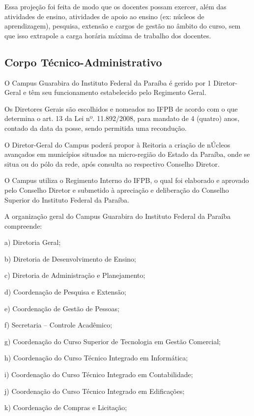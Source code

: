 Essa proje\c{c}\~ao foi feita de modo que os docentes possam exercer, al\'em das atividades de ensino, atividades de apoio ao ensino (ex: n\'ucleos de aprendizagem), pesquisa, extens\~ao e cargos de gest\~ao no \^ambito do curso, sem que isso extrapole a carga hor\'aria m\'axima de trabalho dos docentes.

\subsection{Corpo T\'ecnico-Administrativo}

O Campus Guarabira do Instituto Federal da Paraíba é gerido por 1 Diretor-Geral e têm seu funcionamento estabelecido pelo Regimento Geral.

Os Diretores Gerais são escolhidos e nomeados no IFPB de acordo com o que determina o art. 13 da Lei nº. 11.892/2008, para mandato de 4 (quatro) anos, contado da data da posse, sendo permitida uma recondução.

O Diretor-Geral do Campus poderá propor à Reitoria a criação de nÚcleos avançados em municípios situados na micro-região do Estado da Paraíba, onde se situa ou do pólo da rede, após consulta ao respectivo Conselho Diretor.

O Campus utiliza o Regimento Interno do IFPB, o qual foi elaborado e aprovado pelo Conselho Diretor e submetido à apreciação e deliberação do Conselho Superior do Instituto Federal da Paraíba.

A organização geral do Campus Guarabira do Instituto Federal da Paraíba compreende:

a)	Diretoria Geral;

b)	Diretoria de Desenvolvimento de Ensino;

c)	Diretoria de Administração e Planejamento;

d)	Coordenação de Pesquisa e Extensão;

e)	Coordenação de Gestão de Pessoas;

f)	Secretaria – Controle Acadêmico;

g)	Coordenação do Curso Superior de Tecnologia em Gestão Comercial;

h)	Coordenação do Curso T\'ecnico Integrado em Inform\'atica;

i)	Coordenação do Curso T\'ecnico Integrado em Contabilidade;

j)	Coordenação do Curso T\'ecnico Integrado em Edifica\c{c}\~oes;

k)      Coordena\c{c}\~ao de Compras e Licita\c{c}\~ao;

